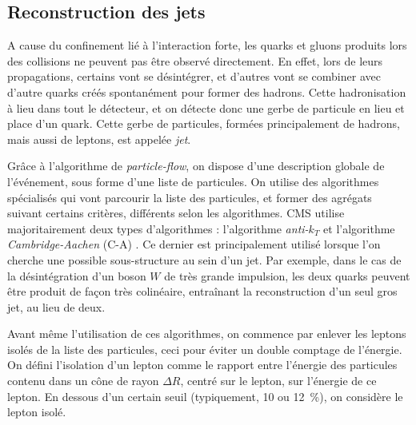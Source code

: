 \subsection{Reconstruction des jets}


A cause du confinement lié à l'interaction forte, les quarks et gluons produits lors des collisions ne peuvent pas être observé directement. En effet, lors de leurs propagations, certains vont se désintégrer, et d'autres vont se combiner avec d'autre quarks créés spontanément pour former des hadrons. Cette hadronisation à lieu dans tout le détecteur, et on détecte donc une gerbe de particule en lieu et place d'un quark. Cette gerbe de particules, formées principalement de hadrons, mais aussi de leptons, est appelée \emph{jet}. %

Grâce à l'algorithme de \emph{particle-flow}, on dispose d'une description globale de l'événement, sous forme d'une liste de particules. On utilise des algorithmes spécialisés qui vont parcourir la liste des particules, et former des agrégats suivant certains critères, différents selon les algorithmes. CMS utilise majoritairement deux types d'algorithmes : l'algorithme \emph{anti-$k_T$} \citep{antikt} et l'algorithme \emph{Cambridge-Aachen} (C-A) \citep{ca_jets}. Ce dernier est principalement utilisé lorsque l'on cherche une possible sous-structure au sein d'un jet. Par exemple, dans le cas de la désintégration d'un boson $W$ de très grande impulsion, les deux quarks peuvent être produit de façon très colinéaire, entraînant la reconstruction d'un seul gros jet, au lieu de deux.

Avant même l'utilisation de ces algorithmes, on commence par enlever les leptons isolés de la liste des particules, ceci pour éviter un double comptage de l'énergie. On défini l'isolation d'un lepton comme le rapport entre l'énergie des particules contenu dans un cône de rayon $\Delta R$, centré sur le lepton, sur l'énergie de ce lepton. En dessous d'un certain seuil (typiquement, \num{10} ou \SI{12}{\%}), on considère le lepton isolé.

